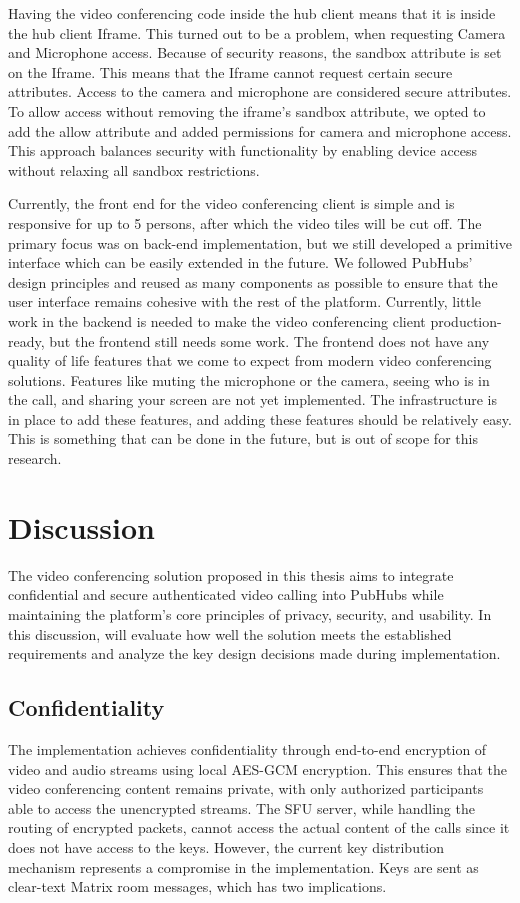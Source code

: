 \documentclass{report}
\begin{document}
Having the video conferencing code inside the hub client means that it is inside the hub client Iframe.
This turned out to be a problem, when requesting Camera and Microphone access. Because of security reasons, the
sandbox attribute is set on the Iframe. This means that the Iframe cannot request certain secure attributes.
Access to the camera and microphone are considered secure attributes.
To allow access without removing the iframe’s sandbox attribute, we opted to add the allow attribute and added
permissions for camera and microphone access.
This approach balances security with functionality by enabling device access without relaxing all sandbox restrictions.

Currently, the front end for the video conferencing client is simple and is responsive for up to 5 persons, after which
the video tiles will be cut off.
The primary focus was on back-end implementation, but we still developed a primitive interface which can be easily
extended in the future.
We followed PubHubs’ design principles and reused as many components as possible to ensure that the user interface
remains cohesive with the rest of the platform. Currently, little work in the backend is needed to make the video
conferencing client production-ready, but the frontend still needs some work. The frontend does not have any quality
of life features that we come to expect from modern video conferencing solutions. Features like muting the
microphone or the camera, seeing who is in the call, and sharing your screen are not yet implemented. The
infrastructure is in place to add these features, and adding these features should be relatively easy. This is
something that can be done in the future, but is out of scope for this research.

\chapter{Discussion}
The video conferencing solution proposed in this thesis aims to integrate confidential and secure authenticated video
calling into PubHubs while maintaining the platform's core principles of privacy, security, and usability. In this
discussion, will
evaluate how well the solution meets the established requirements and analyze the key design decisions made during
implementation.

\section{Confidentiality}
The implementation achieves confidentiality through end-to-end encryption of video and audio streams using local
AES-GCM encryption. This ensures that the video conferencing content remains private, with only authorized
participants able to access the unencrypted streams. The SFU server, while handling the routing of encrypted
packets, cannot access the actual content of the calls since it does not have access to the keys. However, the current
key distribution mechanism represents a compromise in the implementation. Keys are sent as
clear-text Matrix room messages, which has two implications.
\end{document}
